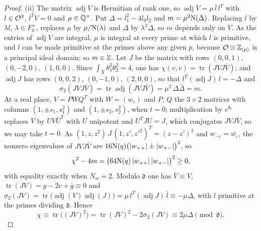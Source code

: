 \begin{proof}
(ii) The matrix $\operatorname{adj}V$ is Hermitian of rank one, so
$\operatorname{adj}V=\mu\,\bar l\,l^{T}$ with $l\in\mathcal{O}^{3}$, $l^{T}V=0$ and
$\mu\in\mathbb{Q}^{\times}$. Put $\Delta=l_{1}^{2}-4l_{0}l_{2}$ and
$m=\mu^{2}\mathrm{N}(\Delta)$. Replacing $l$ by $\lambda l$, $\lambda\in F_{0}^{\times}$,
replaces $\mu$ by $\mu/\mathrm{N}(\lambda)$ and $\Delta$ by $\lambda^{2}\Delta$, so $m$
depends only on $V$. As the entries of $\operatorname{adj}V$ are integral,
$\mu$ is integral at every prime at which $l$ is primitive, and $l$ can be
made primitive at the primes above any given $p$, because
$\mathcal{O}\otimes\mathbb{Z}_{(p)}$ is a principal ideal domain; so $m\in\mathbb{Z}$. Let $J$ be
the matrix with rows $(0,0,1)$, $(0,-2,0)$, $(1,0,0)$. Since
$\int_{X}\theta_{1}^{2}\theta_{2}^{2}=4$, one has $\chi(v,v)=\operatorname{tr}
(JVJ\bar V)$; and $\operatorname{adj}J$ has rows $(0,0,2)$, $(0,-1,0)$,
$(2,0,0)$, so that $l^{T}(\operatorname{adj}J)\,l=-\Delta$ and
\[
  \sigma_{2}(JVJ\bar V)=\operatorname{tr}\operatorname{adj}(JVJ\bar V)
  =\mu^{2}\,\Delta\bar\Delta=m .
\]
At a real place, $V=PWQ^{T}$ with $W=(w_{\varepsilon})$ and $P$, $Q$ the
$3\times2$ matrices with columns $(1,\pm s_{1},s_{1}^{2})$ and
$(1,\pm s_{2},s_{2}^{2})$, when $t=0$; multiplication by $e^{\theta_{t}}$
replaces $V$ by $UV\bar U^{T}$ with $U$ unipotent and $U^{T}JU=J$, which
conjugates $JVJ\bar V$, so we may take $t=0$. As
$(1,z,z^{2})\,J\,(1,z',z'^{2})^{T}=(z-z')^{2}$ and
$w_{-\varepsilon}=\overline{w_{\varepsilon}}$, the nonzero eigenvalues of
$JVJ\bar V$ are $16\mathrm{N}(q)\bigl(|w_{++}|\pm|w_{+-}|\bigr)^{2}$, so
\[
  \chi^{2}-4m=\bigl(64\mathrm{N}(q)\,|w_{++}|\,|w_{+-}|\bigr)^{2}\ge0,
\]
with equality exactly when $N_{w}=2$. Modulo $\mathfrak d$ one has
$\bar V\equiv V$, $\operatorname{tr}(JV)=g-2c+\bar g\equiv0$ and
$\sigma_{2}(JV)=\operatorname{tr}\bigl(\operatorname{adj}(V)\operatorname{adj}(J)\bigr)
=\mu\,l^{T}(\operatorname{adj}J)\,\bar l\equiv-\mu\Delta$, with $l$ primitive at
the primes dividing $\mathfrak d$. Hence
\[
  \chi\equiv\operatorname{tr}\bigl((JV)^{2}\bigr)
  =\operatorname{tr}(JV)^{2}-2\sigma_{2}(JV)\equiv2\mu\Delta
  \pmod{\mathfrak d}.
\]


\end{proof}
